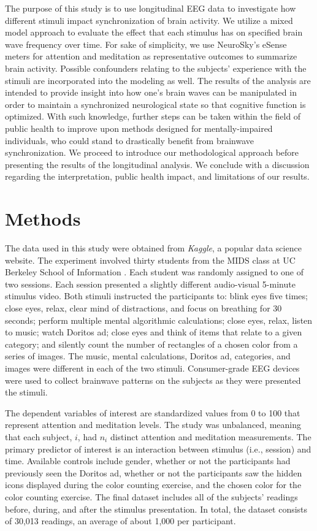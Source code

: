 \documentclass{article}[12pt]
\begin{document}
The purpose of this study is to use longitudinal EEG data to investigate how different stimuli impact synchronization of brain activity. We utilize a mixed model approach to evaluate the effect that each stimulus has on specified brain wave frequency over time.  For sake of simplicity, we use NeuroSky's eSense meters for attention and meditation as representative outcomes to summarize brain activity.  Possible confounders relating to the subjects' experience with the stimuli are incorporated into the modeling as well.  The results of the analysis are intended to provide insight into how one's brain waves can be manipulated in order to maintain a synchronized neurological state so that cognitive function is optimized. With such knowledge, further steps can be taken within the field of public health to improve upon methods designed for mentally-impaired individuals, who could stand to drastically benefit from brainwave synchronization. We proceed to introduce our methodological approach before presenting the results of the longitudinal analysis. We conclude with a discussion regarding the interpretation, public health impact, and limitations of our results.


\section{Methods}

The data used in this study were obtained from \textit{Kaggle}, a popular data science website.
The experiment involved thirty students from the MIDS class at UC Berkeley School of Information \cite{data}. Each student was randomly assigned to one of two sessions. Each session presented a slightly different audio-visual 5-minute stimulus video. Both stimuli instructed the participants to: blink eyes five times; close eyes, relax, clear mind of distractions, and focus on breathing for 30 seconds; perform multiple mental algorithmic calculations; close eyes, relax, listen to music; watch Doritos ad; close eyes and think of items that relate to a given category; and silently count the number of rectangles of a chosen color from a series of images. The music, mental calculations, Doritos ad, categories, and images were different in each of the two stimuli. Consumer-grade EEG devices were used to collect brainwave patterns on the subjects as they were presented the stimuli. 

The dependent variables of interest are standardized values from 0 to 100 that represent attention and meditation levels. The study was unbalanced, meaning that each subject, $i$, had $n_i$ distinct attention and meditation measurements. The primary predictor of interest is an interaction between stimulus (i.e., session) and time. Available controls include gender, whether or not the participants had previously seen the Doritos ad, whether or not the participants saw the hidden icons displayed during the color counting exercise, and the chosen color for the color counting exercise. The final dataset includes all of the subjects’ readings before, during, and after the stimulus presentation. In total, the dataset consists of 30,013 readings, an average of about 1,000 per participant.
\end{document}
